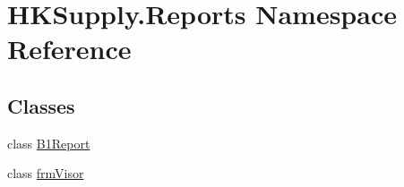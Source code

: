 \hypertarget{namespace_h_k_supply_1_1_reports}{}\section{H\+K\+Supply.\+Reports Namespace Reference}
\label{namespace_h_k_supply_1_1_reports}
\subsection*{Classes}
\begin{DoxyCompactItemize}
\item 
class \mbox{\hyperlink{class_h_k_supply_1_1_reports_1_1_b1_report}{B1\+Report}}
\item 
class \mbox{\hyperlink{class_h_k_supply_1_1_reports_1_1frm_visor}{frm\+Visor}}
\end{DoxyCompactItemize}
